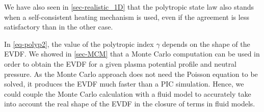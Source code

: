 We have also seen in \cref{sec-realistic_1D} that the polytropic state law also stands when a self-consistent heating mechanism is used, even if the agreement is less satisfactory than in the other case.

In \cref{eq-polyp2}, the value of the polytropic index $\gamma$ depends on the shape of the \ac{EVDF}.
We showed in \cref{sec-MCM} that a Monte Carlo computation can be used in order to obtain the \ac{EVDF} for a given plasma potential profile and neutral pressure.
As the Monte Carlo approach does not need the Poisson equation to be solved, it produces the \ac{EVDF} much faster than a \ac{PIC} simulation.
Hence, we could couple the Monte Carlo calculation with a fluid model to accurately take into account the real shape of the \ac{EVDF} in the closure of terms in fluid models.


